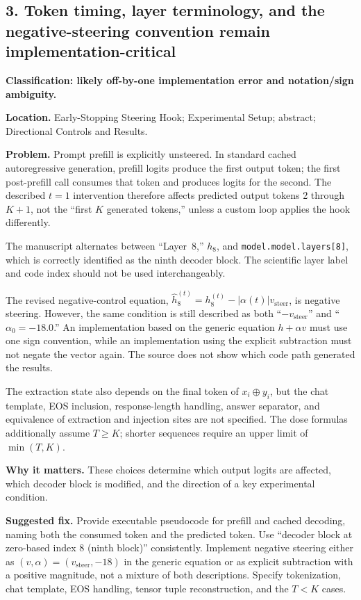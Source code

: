 \documentclass[11pt]{article}
\begin{document}
\subsection*{3. Token timing, layer terminology, and the negative-steering convention remain implementation-critical}

\textbf{Classification: likely off-by-one implementation error and notation/sign ambiguity.}

\textbf{Location.} Early-Stopping Steering Hook; Experimental Setup; abstract; Directional Controls and Results.

\textbf{Problem.} Prompt prefill is explicitly unsteered.  In standard cached autoregressive generation, prefill logits produce the first output token; the first post-prefill call consumes that token and produces logits for the second.  The described $t=1$ intervention therefore affects predicted output tokens 2 through $K+1$, not the ``first $K$ generated tokens,'' unless a custom loop applies the hook differently.

The manuscript alternates between ``Layer~8,'' $h_8$, and \texttt{model.model.layers[8]}, which is correctly identified as the ninth decoder block.  The scientific layer label and code index should not be used interchangeably.

The revised negative-control equation, $\hat h_8^{(t)}=h_8^{(t)}-|\alpha(t)|v_{\text{steer}}$, is negative steering.  However, the same condition is still described as both ``$-v_{\text{steer}}$'' and ``$\alpha_0=-18.0$.''  An implementation based on the generic equation $h+\alpha v$ must use one sign convention, while an implementation using the explicit subtraction must not negate the vector again.  The source does not show which code path generated the results.

The extraction state also depends on the final token of $x_i\oplus y_i$, but the chat template, EOS inclusion, response-length handling, answer separator, and equivalence of extraction and injection sites are not specified.  The dose formulas additionally assume $T\ge K$; shorter sequences require an upper limit of $\min(T,K)$.

\textbf{Why it matters.} These choices determine which output logits are affected, which decoder block is modified, and the direction of a key experimental condition.

\textbf{Suggested fix.} Provide executable pseudocode for prefill and cached decoding, naming both the consumed token and the predicted token.  Use ``decoder block at zero-based index 8 (ninth block)'' consistently.  Implement negative steering either as $(v,\alpha)=(v_{\text{steer}},-18)$ in the generic equation or as explicit subtraction with a positive magnitude, not a mixture of both descriptions.  Specify tokenization, chat template, EOS handling, tensor tuple reconstruction, and the $T<K$ cases.
\end{document}
